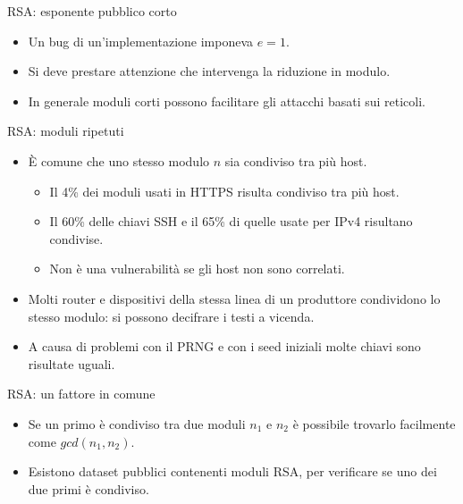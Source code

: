 \documentclass[11pt,svgnames,smaller,aspectratio=169,italian]{beamer}
\begin{document}
\begin{frame}{RSA: esponente pubblico corto}
	\begin{itemize}
		\item Un bug di un'implementazione imponeva $e = 1$.
		\item Si deve prestare attenzione che intervenga la riduzione in modulo.
		\item In generale moduli corti possono facilitare gli attacchi basati sui reticoli.
	\end{itemize}
\end{frame}

\begin{frame}{RSA: moduli ripetuti}
	\begin{itemize}
		\item È comune che uno stesso modulo $n$ sia condiviso tra più host.
			\begin{itemize}
				\item Il 4\% dei moduli usati in HTTPS risulta condiviso tra più host.
				\item Il 60\% delle chiavi SSH e il 65\% di quelle usate per IPv4 risultano condivise.
				\item Non è una vulnerabilità se gli host non sono correlati.
			\end{itemize}
		\item Molti router e dispositivi della stessa linea di un produttore condividono lo stesso modulo: si possono decifrare i testi a vicenda.
		\item A causa di problemi con il PRNG e con i seed iniziali molte chiavi sono risultate uguali.
	\end{itemize}
\end{frame}


\begin{frame}{RSA: un fattore in comune}
	\begin{itemize}
		\item Se un primo è condiviso tra due moduli $n_{1}$ e $n_{2}$ è possibile trovarlo facilmente come $gcd(n_{1}, n_{2})$.
		\item Esistono dataset pubblici contenenti moduli RSA, per verificare se uno dei due primi è condiviso.
	\end{itemize}
\end{frame}
\end{document}
